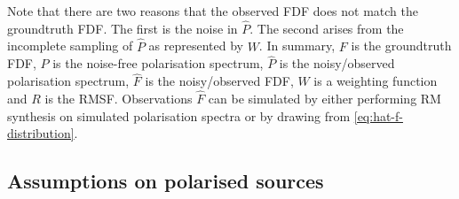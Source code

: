   Note that there are two reasons that the observed FDF does not match the groundtruth FDF. The first is the noise in $\hat P$. The second arises from the incomplete sampling of $\hat P$ as represented by $W$. In summary, $F$ is the groundtruth FDF, $P$ is the noise-free polarisation spectrum, $\hat P$ is the noisy/observed polarisation spectrum, $\hat F$ is the noisy/observed FDF, $W$ is a weighting function and $R$ is the RMSF. Observations $\hat F$ can be simulated by either performing RM synthesis on simulated polarisation spectra or by drawing from \autoref{eq:hat-f-distribution}.


  \subsection{Assumptions on polarised sources}
  \label{sec:faraday-assumptions}

